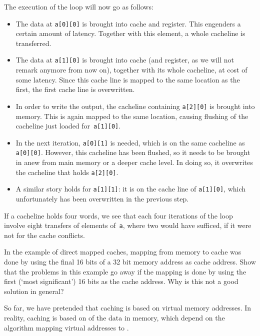 The execution of the loop will now
go as follows:
\begin{itemize}
\item The data at \texttt{a[0][0]} is brought into cache and
  register. This engenders a certain amount of latency. Together with
  this element, a whole cacheline is transferred.
\item The data at \texttt{a[1][0]} is brought into cache (and
  register, as we will not remark anymore from now on), together
  with its whole cacheline, at cost of some latency. Since this cache
  line is mapped to the same location as the first, the first cache
  line is overwritten.
\item In order to write the output, the cacheline containing
  \texttt{a[2][0]} is brought into memory. This is again mapped to the
  same location, causing flushing of the cacheline just loaded
  for~\texttt{a[1][0]}.
\item In the next iteration, \texttt{a[0][1]} is needed, which is
  on the same cacheline as \texttt{a[0][0]}. However, this cacheline
  has been flushed, so it needs to be brought in anew from main memory
  or a deeper cache level. In doing so, it overwrites the cacheline
  that holds \texttt{a[2][0]}.
\item A similar story holds for \texttt{a[1][1]}: it is on the cache
  line of \texttt{a[1][0]}, which unfortunately has been overwritten in
  the previous step.
\end{itemize}
If a cacheline holds four words, we see that each four iterations of
the loop involve eight transfers of elements of~\texttt{a}, where two
would have sufficed, if it were not for the cache conflicts.

\begin{exercise}
  In the example of direct mapped caches, mapping from memory to cache
  was done by using the final 16 bits of a 32 bit memory address as
  cache address. Show that the problems in this example go away if the
  mapping is done by using the first (`most significant') 16 bits as
  the cache address. Why is this not a good solution in general?
\end{exercise}

\begin{remark}
  So far, we have pretended that caching is based on virtual memory
  addresses. In reality, caching is based on  of the data in memory, which depend on the algorithm
  mapping virtual addresses to .
\end{remark}

